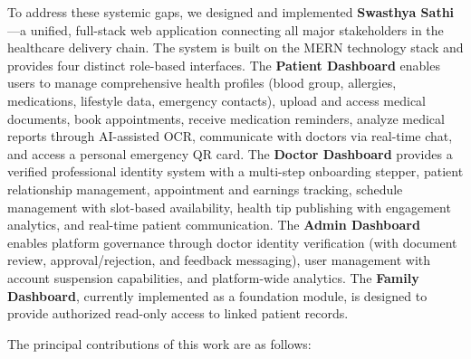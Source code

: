 \documentclass[conference]{IEEEtran}
\begin{document}
To address these systemic gaps, we designed and implemented \textbf{Swasthya Sathi}—a unified, full-stack web application connecting all major stakeholders in the healthcare delivery chain. The system is built on the MERN technology stack and provides four distinct role-based interfaces. The \textbf{Patient Dashboard} enables users to manage comprehensive health profiles (blood group, allergies, medications, lifestyle data, emergency contacts), upload and access medical documents, book appointments, receive medication reminders, analyze medical reports through AI-assisted OCR, communicate with doctors via real-time chat, and access a personal emergency QR card. The \textbf{Doctor Dashboard} provides a verified professional identity system with a multi-step onboarding stepper, patient relationship management, appointment and earnings tracking, schedule management with slot-based availability, health tip publishing with engagement analytics, and real-time patient communication. The \textbf{Admin Dashboard} enables platform governance through doctor identity verification (with document review, approval/rejection, and feedback messaging), user management with account suspension capabilities, and platform-wide analytics. The \textbf{Family Dashboard}, currently implemented as a foundation module, is designed to provide authorized read-only access to linked patient records.

The principal contributions of this work are as follows:
\end{document}
